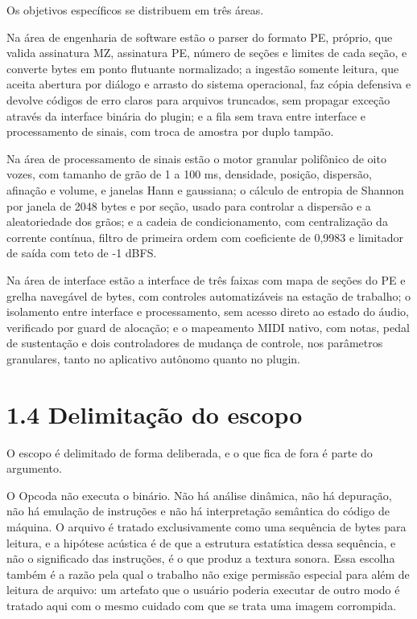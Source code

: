 \documentclass[12pt,a4paper]{article}
\begin{document}
Os objetivos específicos se distribuem em três áreas.


Na área de engenharia de software estão o parser do formato PE, próprio, que valida assinatura MZ, assinatura PE, número de seções e limites de cada seção, e converte bytes em ponto flutuante normalizado; a ingestão somente leitura, que aceita abertura por diálogo e arrasto do sistema operacional, faz cópia defensiva e devolve códigos de erro claros para arquivos truncados, sem propagar exceção através da interface binária do plugin; e a fila sem trava entre interface e processamento de sinais, com troca de amostra por duplo tampão.


Na área de processamento de sinais estão o motor granular polifônico de oito vozes, com tamanho de grão de 1 a 100 ms, densidade, posição, dispersão, afinação e volume, e janelas Hann e gaussiana; o cálculo de entropia de Shannon por janela de 2048 bytes e por seção, usado para controlar a dispersão e a aleatoriedade dos grãos; e a cadeia de condicionamento, com centralização da corrente contínua, filtro de primeira ordem com coeficiente de 0,9983 e limitador de saída com teto de -1 dBFS.


Na área de interface estão a interface de três faixas com mapa de seções do PE e grelha navegável de bytes, com controles automatizáveis na estação de trabalho; o isolamento entre interface e processamento, sem acesso direto ao estado do áudio, verificado por guard de alocação; e o mapeamento MIDI nativo, com notas, pedal de sustentação e dois controladores de mudança de controle, nos parâmetros granulares, tanto no aplicativo autônomo quanto no plugin.


\section*{1.4 Delimitação do escopo}

O escopo é delimitado de forma deliberada, e o que fica de fora é parte do argumento.


O Opcoda não executa o binário. Não há análise dinâmica, não há depuração, não há emulação de instruções e não há interpretação semântica do código de máquina. O arquivo é tratado exclusivamente como uma sequência de bytes para leitura, e a hipótese acústica é de que a estrutura estatística dessa sequência, e não o significado das instruções, é o que produz a textura sonora. Essa escolha também é a razão pela qual o trabalho não exige permissão especial para além de leitura de arquivo: um artefato que o usuário poderia executar de outro modo é tratado aqui com o mesmo cuidado com que se trata uma imagem corrompida.
\end{document}

